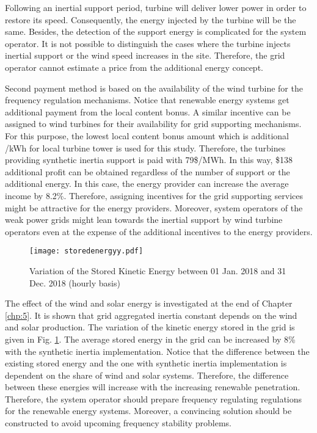 Following an inertial support period, turbine will deliver lower power in order to restore its speed. Consequently, the energy injected by the turbine will be the same. Besides, the detection of the support energy is complicated for the system operator. It is not possible to distinguish the cases where the turbine injects inertial support or the wind speed increases in the site. Therefore, the grid operator cannot estimate a price from the additional energy concept.\par
Second payment method is based on the availability of the wind turbine for the frequency regulation mechanisms. Notice that renewable energy systems get additional payment from the local content bonus. A similar incentive can be assigned to wind turbines for their availability for grid supporting mechanisms. For this purpose, the lowest local content bonus amount which is additional \cent/kWh for local turbine tower is used for this study. Therefore, the turbines providing synthetic inertia support is paid with 79\$/MWh. In this way, \$138 additional profit can be obtained regardless of the number of support or the additional energy. In this case, the energy provider can increase the average income by 8.2\%. Therefore, assigning incentives for the grid supporting services might be attractive for the energy providers. Moreover, system operators of the weak power grids might lean towards the inertial support by wind turbine operators even at the expense of the additional incentives to the energy providers.\par 
\begin{figure}[h!]
	\centering
	\texttt{[image: storedenergyy.pdf]}
	\caption{Variation of the Stored Kinetic Energy between 01 Jan. 2018 and 31 Dec. 2018 (hourly basis)}
	\label{gridstored}
\end{figure}
The effect of the wind and solar energy is investigated at the end of Chapter \ref{chp:5}. It is shown that grid aggregated inertia constant depends on the wind and solar production. The variation of the kinetic energy stored in the grid is given in Fig. \ref{gridstored}. The average stored energy in the grid can be increased by 8\% with the synthetic inertia implementation. Notice that the difference between the existing stored energy and the one with synthetic inertia implementation is dependent on the share of wind and solar systems. Therefore, the difference between these energies will increase with the increasing renewable penetration. Therefore, the system operator should prepare frequency regulating regulations for the renewable energy systems. Moreover, a convincing solution should be constructed to avoid upcoming frequency stability problems. 
